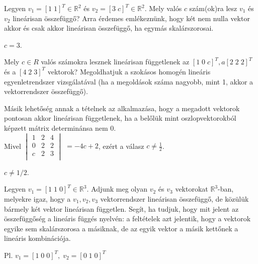\begin{frame}
  \begin{tcolorbox}[title={3/3. {\symknight}}]
       Legyen $v_1 = [1 \; 1]^T \in \mathbb{R}^2$ és $v_2 = [3 \; c]^T \in \mathbb{R}^2$. Mely valós $c$ szám(ok)ra lesz $v_1$ és $v_2$ lineárisan összefüggő?
  \tcblower
    Arra érdemes emlékeznünk, hogy két nem nulla vektor akkor és csak akkor lineárisan összefüggő, ha egymás skalárszorosai.\\
    \mmedskip 
  
    $c = 3$.
  \end{tcolorbox}
\end{frame}


\begin{frame}
  \begin{tcolorbox}[title={3/4. {\symrook}}]
       Mely $c \in R$ valós számokra lesznek lineárisan függetlenek az $[1 \; 0 \; c]^T, a [2 \; 2 \; 2]^T$ és a $[4 \; 2 \; 3]^T$ vektorok?
  \tcblower
    Megoldhatjuk a szokásos homogén lineáris egyenletrendszer vizsgálatával (ha a megoldások száma nagyobb, mint 1, akkor a vektorrendszer összefüggő).\\
    \mmedskip
    
    Másik lehetőség annak a tételnek az alkalmazása, hogy a megadott vektorok pontosan akkor lineárisan függetlenek, ha a belőlük mint oszlopvektorokból képzett mátrix determinánsa nem 0.\\
    Mivel $\begin{vmatrix} 
  				1 & 2 & 4 \\
  				0 & 2 & 2 \\
  				c & 2 & 3 \\
			\end{vmatrix}$ $= -4c + 2$, ezért a válasz $c \neq \frac{1}{2}$.\\
    \mmedskip 
  
    $c \neq 1/2$.
  \end{tcolorbox}
\end{frame}


\begin{frame}
  \begin{tcolorbox}[title={3/5. {\symrook}}]
       Legyen $v_1 = [1 \; 1 \; 0]^T \in \mathbb{R}^3$. Adjunk meg olyan $v_2$ és $v_3$ vektorokat $\mathbb{R}^3$-ban, melyekre igaz, hogy a $v_1,v_2,v_3$ vektorrendszer lineárisan összefüggő, de közülük bármely két vektor lineárisan független.
  \tcblower
    Segít, ha tudjuk, hogy mit jelent az összefüggőség a lineáris függés nyelvén: a feltételek azt jelentik, hogy a vektorok egyike sem skalárszorosa a másiknak, de az egyik vektor a másik kettőnek a lineáris kombinációja. \\
    \mmedskip 
  
	Pl. $v_1 = [1  \; 0  \; 0]^T,\; v_2 = [0  \; 1  \; 0]^T$
  \end{tcolorbox}
\end{frame}


